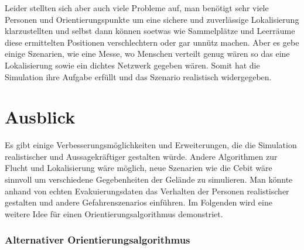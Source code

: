 Leider stellten sich aber auch viele Probleme auf, man benötigt sehr viele Personen und Orientierungspunkte um eine sichere und zuverlässige Lokalisierung klarzustellten und selbst dann können soetwas wie Sammelplätze und Leerräume diese ermittelten Positionen verschlechtern oder gar unnütz machen. Aber es gebe einige Szenarien, wie eine Messe, wo Menschen verteilt genug wären so das eine Lokalisierung sowie ein dichtes Netzwerk gegeben wären. Somit hat die Simulation ihre Aufgabe erfüllt und das Szenario realistisch widergegeben.

\section{Ausblick}
Es gibt einige Verbesserungsmöglichkeiten und Erweiterungen, die die Simulation realistischer und Aussagekräftiger gestalten würde. Andere Algorithmen zur Flucht und Lokalisierung wäre möglich, neue Szenarien wie die Cebit wäre sinnvoll um verschiedene Gegebenheiten der Gelände zu simulieren. Man könnte anhand von echten Evakuierungsdaten das Verhalten der Personen realistischer gestalten und andere Gefahrenszenarios einführen. Im Folgenden wird eine weitere Idee für einen Orientierungsalgorithmus demonstriet.

\subsubsection{Alternativer Orientierungsalgorithmus}
\label{sec:bug-0}

